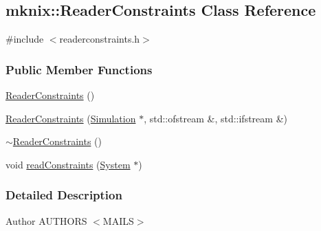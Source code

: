 \hypertarget{classmknix_1_1_reader_constraints}{\subsection{mknix\-:\-:Reader\-Constraints Class Reference}
\label{classmknix_1_1_reader_constraints}
}


{\ttfamily \#include $<$readerconstraints.\-h$>$}

\subsubsection*{Public Member Functions}
\begin{DoxyCompactItemize}
\item 
\hyperlink{classmknix_1_1_reader_constraints_a6e13e87da554b6a10dfadce3a90ad1fe}{Reader\-Constraints} ()
\item 
\hyperlink{classmknix_1_1_reader_constraints_a89f7f8f61866a81b47063b16c3c953a5}{Reader\-Constraints} (\hyperlink{classmknix_1_1_simulation}{Simulation} $\ast$, std\-::ofstream \&, std\-::ifstream \&)
\item 
\hyperlink{classmknix_1_1_reader_constraints_ae2c0d3f6e3c0d8fdfd99d4902fa8cd0f}{$\sim$\-Reader\-Constraints} ()
\item 
void \hyperlink{classmknix_1_1_reader_constraints_a6661437710a3faf4792236e7b2bf760f}{read\-Constraints} (\hyperlink{classmknix_1_1_system}{System} $\ast$)
\end{DoxyCompactItemize}


\subsubsection{Detailed Description}
\begin{DoxyAuthor}{Author}
A\-U\-T\-H\-O\-R\-S $<$\-M\-A\-I\-L\-S$>$ 
\end{DoxyAuthor}


